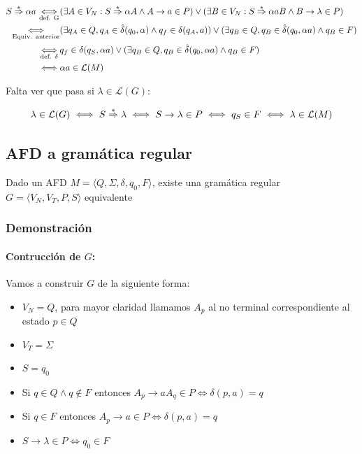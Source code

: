\begin{align*}
  S\overset{*}{\Rightarrow} \alpha a \underset{\text{def. G}}{\iff} & (\exists A\in V_N: S \overset{*}{\Rightarrow} \alpha A \wedge A \rightarrow a \in P)\lor(\exists B\in V_N: S \overset{*}{\Rightarrow} \alpha aB \wedge B \rightarrow \lambda \in P)    \\
  \underset{\text{Equiv. anterior}}{\iff}          & (\exists q_A\in Q, q_A\in\hat\delta(q_0, \alpha) \land q_f\in\delta(q_A, a)) \lor (\exists q_B\in Q, q_B\in\hat\delta(q_0, \alpha a) \land q_B\in F) \\
  \underset{\text{def. \(\delta\)}}{\iff}          & q_f\in\delta(q_S, \alpha a) \lor (\exists q_B\in Q, q_B\in\hat\delta(q_0, \alpha a) \land q_B\in F)                                                  \\
  \iff                            & \alpha a \in \mathcal{L}(M)                                                                                                                          \\
\end{align*}

Falta ver que pasa si \(\lambda\in\mathcal{L}(G)\):

\[ \lambda\in\mathcal{L}(G) \iff S\overset{*}{\Rightarrow} \lambda \iff S\rightarrow \lambda \in P \iff q_S\in F \iff \lambda \in \mathcal{L}(M)\]
\subsection{AFD a gramática regular}
Dado un AFD \(M=\langle Q, \Sigma, \delta, q_0, F\rangle\), existe una gramática regular \(G=\langle V_N, V_T, P, S\rangle\) equivalente

\subsubsection{Demonstración}
\paragraph{Contrucción de \(G\):} Vamos a construir \(G\) de la siguiente forma:
\begin{itemize}
  \item \(V_N = Q\), para mayor claridad llamamos \(A_p\) al no terminal correspondiente al estado \(p\in Q\)
  \item \(V_T = \Sigma\)
  \item \(S = q_0\)
  \item Si \(q\in Q \land q\notin F\) entonces \(A_p \rightarrow aA_q \in P \iff \delta(p,a) = q\)
  \item Si \(q\in F\) entonces \(A_p \rightarrow a \in P \iff \delta(p,a) = q\)
  \item \(S\rightarrow \lambda \in P \iff q_0\in F\)
\end{itemize}


